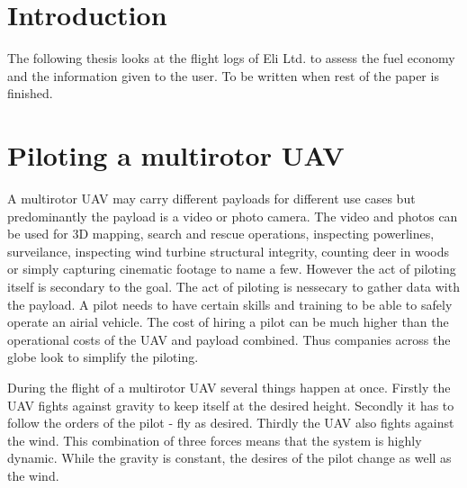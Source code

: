 \documentclass[12pt,oneside]{reedthesis}
\theoremstyle{definition}
\theoremstyle{definition}
\theoremstyle{definition}
\theoremstyle{remark}
\begin{document}
  \listoffigures

  \listoftables

\mainmatter %
\pagestyle{fancyplain} %

\chapter*{Introduction}\label{introduction}

The following thesis looks at the flight logs of Eli Ltd. to assess the
fuel economy and the information given to the user. To be written when
rest of the paper is finished.

\chapter{Piloting a multirotor UAV}\label{piloting}

A multirotor UAV may carry different payloads for different use cases
but predominantly the payload is a video or photo camera. The video and
photos can be used for 3D mapping, search and rescue operations,
inspecting powerlines, surveilance, inspecting wind turbine structural
integrity, counting deer in woods or simply capturing cinematic footage
to name a few. However the act of piloting itself is secondary to the
goal. The act of piloting is nessecary to gather data with the payload.
A pilot needs to have certain skills and training to be able to safely
operate an airial vehicle. The cost of hiring a pilot can be much higher
than the operational costs of the UAV and payload combined. Thus
companies across the globe look to simplify the piloting.

During the flight of a multirotor UAV several things happen at once.
Firstly the UAV fights against gravity to keep itself at the desired
height. Secondly it has to follow the orders of the pilot - fly as
desired. Thirdly the UAV also fights against the wind. This combination
of three forces means that the system is highly dynamic. While the
gravity is constant, the desires of the pilot change as well as the
wind.
\end{document}
